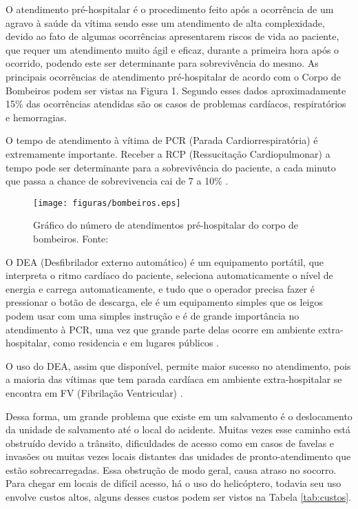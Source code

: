 O atendimento pré-hospitalar é o procedimento feito após a ocorrência de um agravo à saúde da vítima \cite{SBC} sendo esse um atendimento de alta complexidade, 
devido ao fato de algumas ocorrências apresentarem riscos de vida ao paciente, que requer um atendimento muito ágil e eficaz, durante a primeira hora após o ocorrido, 
podendo este ser determinante para sobrevivência do mesmo.\cite{PQA} 
As principais ocorrências de atendimento pré-hospitalar de acordo com o Corpo de Bombeiros podem ser vistas na Figura 1. Segundo esses dados aproximadamente 15\% das ocorrências atendidas são os casos de problemas cardíacos, respiratórios e hemorragias.


O tempo de atendimento à vítima de PCR (Parada Cardiorrespiratória) é extremamente importante. Receber a RCP (Ressucitação Cardiopulmonar) a tempo pode ser determinante para a sobrevivência do paciente, a cada minuto que passa a chance de sobrevivencia cai de 7 a 10\% \cite{SBC}. 
 \begin{figure}[H]
	\centering
		\texttt{[image: figuras/bombeiros.eps]}
	\caption[Gráfico do número de atendimentos pré-hospitalar do corpo de bombeiros]{Gráfico do número de atendimentos pré-hospitalar do corpo de bombeiros. Fonte: \cite{bombeiro}}
\end{figure}

O DEA (Desfibrilador externo automático) é um equipamento portátil, que interpreta o ritmo cardíaco do paciente, seleciona automaticamente o nível de energia e carrega automaticamente, e tudo que o operador precisa fazer é pressionar o botão de descarga, ele é um equipamento simples que os leigos podem usar com uma simples instrução e é de grande importância no atendimento à PCR, uma vez que grande parte delas ocorre em ambiente extra-hospitalar, como residencia e em lugares públicos \cite{SBC}.

O uso do DEA, assim que disponível, permite maior sucesso no atendimento, pois a maioria das vítimas que tem parada cardíaca em ambiente extra-hospitalar se encontra em FV (Fibrilação Ventricular) \cite{SBC}.

Dessa forma, um grande  problema  que existe em um salvamento é o deslocamento da unidade de salvamento até o local do acidente. Muitas vezes esse caminho está obstruído devido a trânsito, dificuldades de acesso como em casos de favelas e invasões ou muitas vezes locais distantes das unidades de pronto-atendimento que estão sobrecarregadas. Essa obstrução de modo geral, causa atraso no socorro.
Para chegar em locais de difícil acesso, há o uso do helicóptero, todavia seu uso envolve custos altos, alguns desses custos podem ser vistos
na Tabela \ref{tab:custos}.

